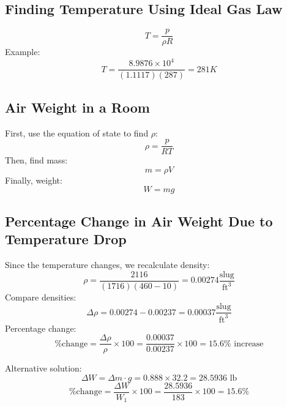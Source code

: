 \documentclass{article}
\begin{document}
\subsection{Finding Temperature Using Ideal Gas Law}
\begin{equation}
    T = \frac{p}{\rho R}
\end{equation}
Example:
\begin{equation}
    T = \frac{8.9876 \times 10^4}{(1.1117)(287)} = 281K
\end{equation}

\subsection{Air Weight in a Room}
First, use the equation of state to find $\rho$:
\begin{equation}
    \rho = \frac{p}{RT}
\end{equation}
Then, find mass:
\begin{equation}
    m = \rho V
\end{equation}
Finally, weight:
\begin{equation}
    W = mg
\end{equation}

\subsection{Percentage Change in Air Weight Due to Temperature Drop}
Since the temperature changes, we recalculate density:
\begin{equation}
    \rho = \frac{2116}{(1716)(460 -10)} = 0.00274 \frac{\text{slug}}{\text{ft}^3}
\end{equation}
Compare densities:
\begin{equation}
    \Delta \rho = 0.00274 - 0.00237 = 0.00037 \frac{\text{slug}}{\text{ft}^3}
\end{equation}
Percentage change:
\begin{equation}
    \% \text{change} = \frac{\Delta \rho}{\rho} \times 100 = \frac{0.00037}{0.00237} \times 100 = 15.6\%\text{ increase}
\end{equation}

Alternative solution:
\begin{equation}
    \Delta W = \Delta m \cdot g = 0.888 \times 32.2 = 28.5936 \text{ lb}
\end{equation}
\begin{equation}
    \% \text{change} = \frac{\Delta W}{W_1} \times 100 = \frac{28.5936}{183} \times 100 = 15.6\%
\end{equation}
\end{document}
